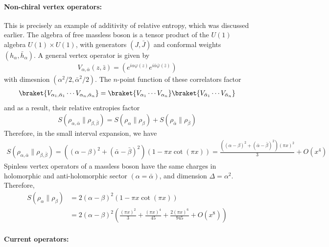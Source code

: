 \documentclass[11pt]{article}
\newcommand{\lb}{\left(}
\newcommand{\rb}{\right)}
\begin{document}
  \paragraph{Non-chiral vertex operators:} This is precisely an example of additivity of relative entropy, which was discussed earlier.
  The algebra of free massless boson is a tensor product of the $U(1)$ algebra $U(1)\times U(1)$, with generators $(J,\bar{J})$ and conformal weights $(h_\alpha,\bar{h}_\alpha)$. A general vertex operator is given by
  \begin{align}
    V_{\alpha,\bar{\alpha}}(z,\bar{z})=(e^{i\alpha \varphi(z)}e^{i\bar{\alpha}\bar{\varphi}(\bar{z})})
  \end{align}
  with dimesnion $(\alpha^2/2,\bar{\alpha}^2/2)$. The $n$-point function of these correlators factor 
  \begin{align}
    \braket{V_{\alpha_1,\bar{\alpha}_1}\cdots V_{\alpha_n,\bar{\alpha}_n}}=\braket{V_{\alpha_1}\cdots V_{\alpha_n}}\braket{V_{\bar{\alpha}_1}\cdots V_{\bar{\alpha}_n}}
  \end{align}
  and as a result, their relative entropies factor
  \begin{align}
  S(\rho_{\alpha,\bar{\alpha}}\|\rho_{\beta,\bar{\beta}})=S(\rho_{\alpha}\|\rho_{\beta})+S(\rho_{\bar{\alpha}}\|\rho_{\bar{\beta}})
  \end{align}
  Therefore, in the small interval expansion, we have
  \begin{align}\label{smallxCoherentstates}
S(\rho_{\alpha,\bar{\alpha}}\|\rho_{\beta,\bar{\beta}})=((\alpha-\beta)^2+(\bar{\alpha}-\bar{\beta})^2)(1-\pi x\cot(\pi x))=\frac{((\alpha-\beta)^2+(\bar{\alpha}-\bar{\beta})^2)(\pi x)^2}{3}+O(x^4)
  \end{align}
  Spinless vertex operators of a massless boson have the same charges in holomorphic and anti-holomorphic sector $(\alpha = \bar \alpha)$, and dimension $\Delta=\alpha^2$. Therefore,
    \begin{align}
  S(\rho_{\alpha}\|\rho_{\beta})&=2(\alpha-\beta)^2(1-\pi x\cot(\pi x))\\
  &= 2(\alpha -\beta)^2\lb \frac{(\pi x)^2}{3} + \frac{(\pi x)^4}{45}  + \frac{2(\pi x)^6}{945} + O(x^8)\rb
  \end{align}

  \paragraph{Current operators:}
\end{document}
